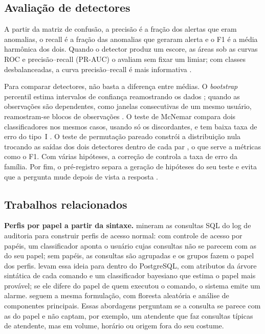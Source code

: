 \subsection{Avaliação de detectores}
\label{sec:avaliacao-detectores}

A partir da matriz de confusão, a precisão é a fração dos alertas que eram anomalias, o recall é
a fração das anomalias que geraram alerta e o F1 é a média harmônica dos dois. Quando o detector
produz um escore, as áreas sob as curvas ROC e precisão--recall (PR-AUC) o avaliam sem fixar um
limiar; com classes desbalanceadas, a curva precisão--recall é mais informativa
\cite{saito2015}.

Para comparar detectores, não basta a diferença entre médias. O \textit{bootstrap} percentil
estima intervalos de confiança reamostrando os dados \cite{efron1993}; quando as observações são
dependentes, como janelas consecutivas de um mesmo usuário, reamostram-se blocos de observações
\cite{kunsch1989}. O teste de McNemar compara dois classificadores nos mesmos casos, usando só os
discordantes, e tem baixa taxa de erro do tipo~I \cite{dietterich1998}. O teste de permutação
pareado constrói a distribuição nula trocando as saídas dos dois detectores dentro de cada par
\cite{noreen1989}, o que serve a métricas como o F1. Com várias hipóteses, a correção de
 controla a taxa de erro da família. Por fim, o pré-registro separa a
geração de hipóteses do seu teste e evita que a pergunta mude depois de vista a resposta
\cite{nosek2018}.

\subsection{Trabalhos relacionados}
\label{sec:trabalhos-relacionados}

\textbf{Perfis por papel a partir da sintaxe.}  mineram as consultas SQL
do log de auditoria para construir perfis de acesso normal: com controle de acesso por papéis,
um classificador aponta o usuário cujas consultas não se parecem com as do seu papel; sem
papéis, as consultas são agrupadas e os grupos fazem o papel dos perfis.
 levam essa ideia para dentro do PostgreSQL, com atributos da árvore
sintática de cada comando e um classificador bayesiano que estima o papel mais provável; se ele
difere do papel de quem executou o comando, o sistema emite um alarme.
 seguem a mesma formulação, com floresta aleatória e análise de
componentes principais. Essas abordagens perguntam se a consulta se parece com as do papel e não
captam, por exemplo, um atendente que faz consultas típicas de atendente, mas em volume, horário
ou origem fora do seu costume.

